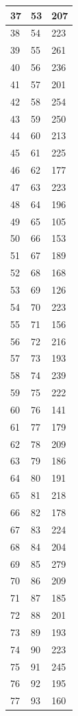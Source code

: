 \begin{tabular}{p{}p{}p{}}
\hline
37 & 53 & 207 \\
\hline
38 & 54 & 223 \\
\hline
39 & 55 & 261 \\
\hline
40 & 56 & 236 \\
\hline
41 & 57 & 201 \\
\hline
42 & 58 & 254 \\
\hline
43 & 59 & 250 \\
\hline
44 & 60 & 213 \\
\hline
45 & 61 & 225 \\
\hline
46 & 62 & 177 \\
\hline
47 & 63 & 223 \\
\hline
48 & 64 & 196 \\
\hline
49 & 65 & 105 \\
\hline
50 & 66 & 153 \\
\hline
51 & 67 & 189 \\
\hline
52 & 68 & 168 \\
\hline
53 & 69 & 126 \\
\hline
54 & 70 & 223 \\
\hline
55 & 71 & 156 \\
\hline
56 & 72 & 216 \\
\hline
57 & 73 & 193 \\
\hline
58 & 74 & 239 \\
\hline
59 & 75 & 222 \\
\hline
60 & 76 & 141 \\
\hline
61 & 77 & 179 \\
\hline
62 & 78 & 209 \\
\hline
63 & 79 & 186 \\
\hline
64 & 80 & 191 \\
\hline
65 & 81 & 218 \\
\hline
66 & 82 & 178 \\
\hline
67 & 83 & 224 \\
\hline
68 & 84 & 204 \\
\hline
69 & 85 & 279 \\
\hline
70 & 86 & 209 \\
\hline
71 & 87 & 185 \\
\hline
72 & 88 & 201 \\
\hline
73 & 89 & 193 \\
\hline
74 & 90 & 223 \\
\hline
75 & 91 & 245 \\
\hline
76 & 92 & 195 \\
\hline
77 & 93 & 160 \\

\end{tabular}
